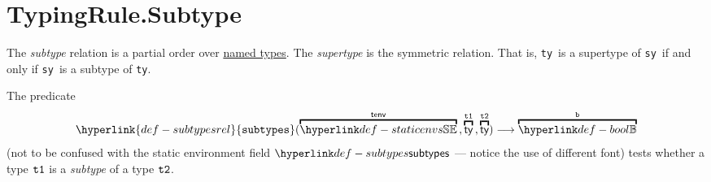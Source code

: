 \documentclass{book}
\newcommand\subtypesrel[0]{\hyperlink{def-subtypesrel}{\texttt{subtypes}}}
\newcommand\tty[0]{\texttt{ty}}
\newcommand\tsy[0]{\texttt{sy}}
\begin{document}
\section{TypingRule.Subtype\label{sec:TypingRule.Subtype}}
The \emph{subtype} relation is a partial order over \underline{named types}.
The \emph{supertype} is the symmetric relation. That is, \tty\ is a supertype of \tsy\ if and only if \tsy\ is a subtype of \tty.

\hypertarget{def-subtypesrel}{}
The predicate
\[
  \subtypesrel(\overname{\staticenvs}{\tenv} \aslsep \overname{\ty}{\vtone} \aslsep \overname{\ty}{\vttwo})
  \aslto \overname{\Bool}{\vb}
\]
(not to be confused with the static environment field $\subtypes$ --- notice the use of different font)
tests whether a type $\texttt{t1}$ is a \emph{subtype} of a type $\texttt{t2}$.
\end{document}
